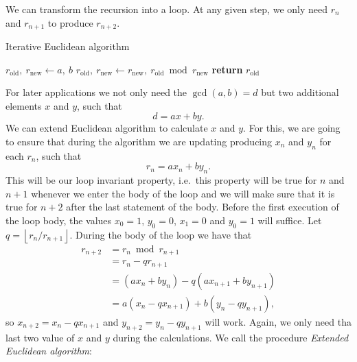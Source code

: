 \documentclass{article}
\begin{document}
We can transform the recursion into a loop.
At any given step, we only need $r_{n}$ and $r_{n+1}$ to produce $r_{n+2}$.
\begin{algorithm}
    \caption{Iterative Euclidean algorithm}
    \label{alg:iterative-gcd}
    \begin{algorithmic}[1]
            \State $r_{\mathrm{old}},\ r_{\mathrm{new}} \gets a,\ b$
                \State $r_{\mathrm{old}},\ r_{\mathrm{new}} \gets r_{\mathrm{new}},\ r_{\mathrm{old}} \bmod r_{\mathrm{new}}$
            \EndWhile
            \State \textbf{return} $r_{\mathrm{old}}$
        \EndProcedure
    \end{algorithmic}
\end{algorithm}

For later applications we not only need the $\gcd(a, b) = d$ but two additional elements $x$ and $y$, such that
\[
    d = ax + by.
\]
We can extend Euclidean algorithm to calculate $x$ and $y$.
For this, we are going to ensure that during the algorithm we are updating producing $x_n$ and $y_n$ for each $r_n$, such that
\[
    r_n = ax_n + by_n.
\]
This will be our loop invariant property, i.e.\ this property will be true for $n$ and $n+1$ whenever we enter the body of the loop and we will make sure that it is true for $n+2$ after the last statement of the body.
Before the first execution of the loop body, the values $x_0 = 1$, $y_0 = 0$, $x_1 = 0$ and $y_0 = 1$ will suffice.
Let $q = \left\lfloor r_n / r_{n+1} \right\rfloor$. During the body of the loop we have that
\begin{align*}
    r_{n+2} &= r_n \bmod r_{n+1} \\
            &= r_n -  q r_{n+1} \\
            &= \left(a x_n + b y_n\right) -q\left(a x_{n+1} + b y_{n+1}\right) \\
            &= a\left(x_n - q x_{n+1}\right) + b\left(y_n - q y_{n+1}\right),
\end{align*}
so $x_{n+2} = x_n - q x_{n+1}$ and $y_{n+2} = y_n - q y_{n+1}$ will work.
Again, we only need tha last two value of $x$ and $y$ during the calculations.
We call the procedure \emph{Extended Euclidean algorithm}:
\end{document}
